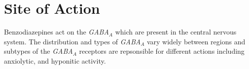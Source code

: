 \chapter{Site of Action}
Benzodiazepines act on the \emph{GABA$_A$} which are present in the central nervous system. The distribution and types of \emph{GABA$_A$} vary widely between regions and subtypes of the \emph{GABA$_A$} receptors are repsonsible for different actions including anxiolytic, and hyponitic activity.

